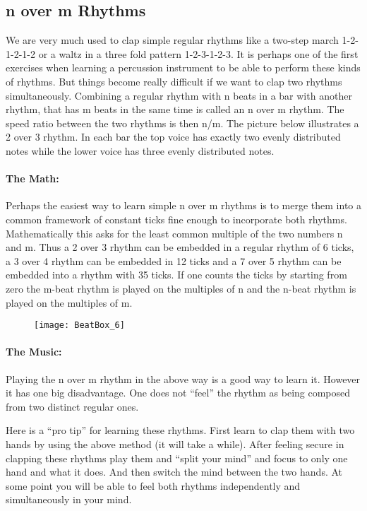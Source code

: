 \subsection{n over m Rhythms}
We are very much used to clap simple regular rhythms like a two-step march 1-2-1-2-1-2 or a waltz in a three fold pattern 1-2-3-1-2-3. It is perhaps one of the first exercises when learning a percussion instrument to be able to perform these kinds of rhythms. But things become really difficult if we want to clap two rhythms simultaneously. Combining a regular rhythm with n beats in a bar with another rhythm, that has m beats in the same time is called an n over m rhythm. The speed ratio between the two rhythms is then n/m. The picture below illustrates a 2 over 3 rhythm. In each bar the top voice has exactly two evenly distributed notes while the lower voice has three evenly distributed notes.

\paragraph{The Math:}
Perhaps the easiest way to learn simple n over m rhythms is to merge them into a common framework of constant ticks fine enough to incorporate both rhythms. Mathematically this asks for the least common multiple of the two numbers n and m. Thus a 2 over 3 rhythm can be embedded in a regular rhythm of 6 ticks, a 3 over 4 rhythm can be embedded in 12 ticks and a 7 over 5 rhythm can be embedded into a rhythm with 35 ticks. If one counts the ticks by starting from zero the  m-beat rhythm is played on the multiples of n and the n-beat rhythm is played on the multiples of m.

\begin{figure}[h]
\centering
\texttt{[image: BeatBox\_6]}
\end{figure}

\paragraph{The Music:} Playing the n over m rhythm in the above way is a good way to learn it. However it has one big disadvantage. One does not ``feel'' the rhythm as being composed from two distinct regular ones. 

Here is a ``pro tip'' for learning these rhythms. First learn to clap them with two hands by using the above method (it will take a while). After feeling secure in clapping these rhythms play them and ``split your mind'' and focus to only one hand and what it does. And then switch the mind between the two hands. At some point you will be able to feel both rhythms independently and simultaneously in your mind.


